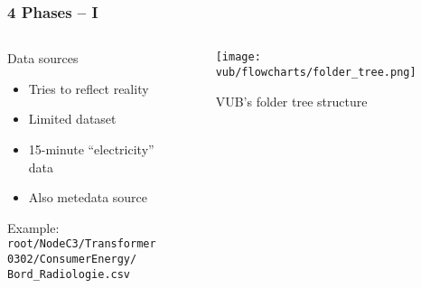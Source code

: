 \begin{frame}
    \frametitle{4 Phases -- I}
    \vspace*{\fill}
    \begin{columns}[onlytextwidth, c]
        \begin{column}{.47\textwidth}
            \begin{exampleblock}{Data sources}
                \begin{itemize}
                    \item Tries to reflect reality
                    \item Limited dataset
                    \item 15-minute ``electricity'' data
                    \item Also metedata source
                \end{itemize}
                Example:\\
                \texttt{root/NodeC3/Transformer\\
                    0302/ConsumerEnergy/\\
                    Bord\_Radiologie.csv}
            \end{exampleblock}
        \end{column}

        \begin{column}{.52\textwidth}
            \begin{figure}[ht]
                \texttt{[image: vub/flowcharts/folder\_tree.png]}
                \caption{\acs{VUB}'s folder tree structure}
            \end{figure}
        \end{column}
    \end{columns}
    \vspace*{\fill}
\end{frame}

